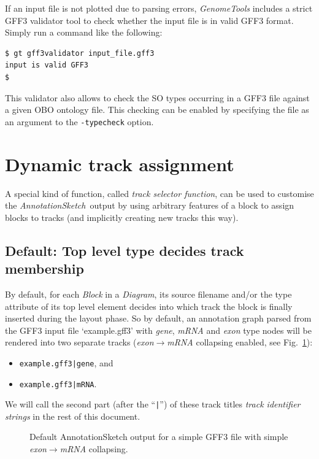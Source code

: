 \documentclass[a4paper]{scrreprt}
\newcommand{\AnnotationSketch}{\emph{AnnotationSketch}\ }
\begin{document}
If an input file is not plotted due to parsing errors, \emph{GenomeTools} includes a strict GFF3 validator tool to check whether the input file is in valid GFF3 format. Simply run a command like the following:
\small
\medskip
\begin{verbatim}
$ gt gff3validator input_file.gff3
input is valid GFF3
$
\end{verbatim}
\normalsize
\medskip
This validator also allows to check the SO types occurring in a GFF3 file against a given OBO ontology file. This checking can be enabled by specifying the file as an argument to the \texttt{-typecheck} option.

\section{Dynamic track assignment}
A special kind of function, called \emph{track selector function}, can be used to customise the \AnnotationSketch output by using arbitrary features of a block to assign blocks to tracks (and implicitly creating new tracks this way).

\subsection{Default: Top level type decides track membership}
By default, for each \emph{Block} in a \emph{Diagram}, its source filename and/or the type attribute of its top level element decides into which track the block is finally inserted during the layout phase. So by default, an annotation graph parsed from the GFF3 input file `example.gff3' with \emph{gene}, \emph{mRNA} and \emph{exon} type nodes will be rendered into two separate tracks (\emph{exon}$\to$\emph{mRNA} collapsing enabled, see Fig.~\ref{tsexample1}):

\begin{itemize}
    \item \texttt{example.gff3|gene}, and
    \item \texttt{example.gff3|mRNA}.
\end{itemize}
We will call the second part (after the ``\texttt{|}'') of these track titles \emph{track identifier strings} in the rest of this document.

\begin{figure}[ht]
\caption{Default AnnotationSketch output for a simple GFF3 file with simple \emph{exon}$\to$\emph{mRNA} collapsing.}
\label{tsexample1}
\end{figure}
\end{document}
